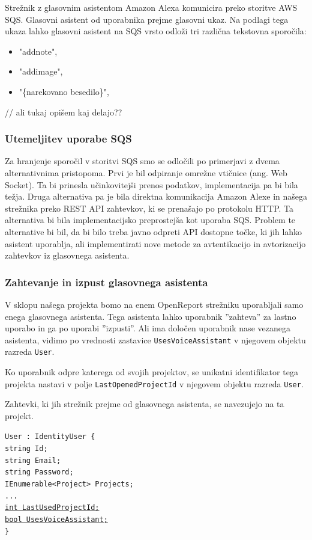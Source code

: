 \documentclass[a4paper, 12pt]{book}
\begin{document}
Strežnik z glasovnim asistentom Amazon Alexa komunicira preko storitve AWS SQS.
Glasovni asistent od uporabnika prejme glasovni ukaz.
Na podlagi tega ukaza lahko glasovni asistent na SQS vrsto odloži tri različna tekstovna sporočila:
\begin{itemize}
	\item "addnote",
	\item "addimage",
	\item "\{narekovano besedilo\}",
\end{itemize}

// ali tukaj opišem kaj delajo??

\subsubsection{Utemeljitev uporabe SQS}
Za hranjenje sporočil v storitvi SQS smo se odločili po primerjavi z dvema alternativnima pristopoma.
Prvi je bil odpiranje omrežne vtičnice (ang. Web Socket).
Ta bi prinesla učinkovitejši prenos podatkov, implementacija pa bi bila težja.
Druga alternativa pa je bila direktna komunikacija Amazon Alexe in našega strežnika preko REST API zahtevkov, ki se prenašajo po protokolu HTTP.
Ta alternativa bi bila implementacijsko preprostejša kot uporaba SQS.
Problem te alternative bi bil, da bi bilo treba javno odpreti API dostopne točke, ki jih lahko asistent uporablja, ali implementirati nove metode za avtentikacijo in avtorizacijo zahtevkov iz glasovnega asistenta.

\subsubsection{Zahtevanje in izpust glasovnega asistenta}

V sklopu našega projekta bomo na enem OpenReport strežniku uporabljali samo enega glasovnega asistenta.
Tega asistenta lahko uporabnik ''zahteva'' za lastno uporabo in ga po uporabi ''izpusti''.
Ali ima določen uporabnik nase vezanega asistenta, vidimo po vrednosti zastavice \texttt{UsesVoiceAssistant} v njegovem objektu razreda \texttt{User}.

Ko uporabnik odpre katerega od svojih projektov, se unikatni identifikator tega projekta nastavi v polje \texttt{LastOpenedProjectId} v njegovem objektu razreda \texttt{User}.

Zahtevki, ki jih strežnik prejme od glasovnega asistenta, se navezujejo na ta projekt.

\noindent \texttt{User : IdentityUser \{ \\
string Id; \\
string Email; \\
string Password; \\
IEnumerable<Project> Projects; \\
... \\
\underline{int LastUsedProjectId;} \\
\underline{bool UsesVoiceAssistant;} \\
\}}
\end{document}
